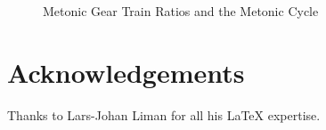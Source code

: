\documentclass[11pt, oneside]{article}   	%
\theoremstyle{definition}
\begin{document}
\bigskip
\begin{figure}[H]
\caption{Metonic Gear Train Ratios and the Metonic Cycle}
\label{fig:metonic_gear_ratios}
\end{figure}

\bigskip
\section{Acknowledgements}

Thanks to Lars-Johan Liman for all his LaTeX expertise.

\newpage


\end{document}
